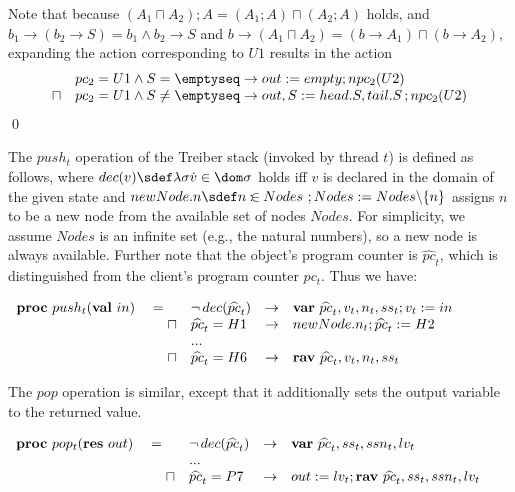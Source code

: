 \documentclass[11pt]{llncs}
\def \proc{{\bf proc}\ }
\def \hpctvar{{\widehat{pc}_t}}
\def \endbox{\hfill \qed}
\def \nasgn {\mathbin{:\joinrel\in}}
\def \asgn  {{\;:=\;}}
\def \var {{\bf var}\ }
\def \rav {{\bf rav}\ }
\def \val {{\bf val}\ }
\def \res {{\bf res}\ }
\begin{document}
\begin{example}
  \noindent 
  Note that because
  $(A_1 \sqcap A_2) ; A = (A_1 ; A) \sqcap (A_2 ; A)$ holds, and
  $b_1 \to ( b_2 \to S) = b_1 \land b_2 \to S$ and
  $b \to (A_1 \sqcap A_2) = (b \to A_1) \sqcap (b \to A_2)$,
  expanding the action corresponding to $U1$ results in the action
  \[
  \begin{array}[t]{@{}ll@{}}
    & pc_2 = U1 \land S = \emptyseq \to out \asgn empty ; npc_2(U2)\\
    \sqcap & pc_2 = U1 \land S \neq \emptyseq \to out, S \asgn head.S,
    tail.S \,; npc_2(U2)
  \end{array}
\]
  \endbox
\end{example}


\begin{example}
  \label{ex:param}
  The $push_t$ operation of the Treiber stack (invoked by thread $t$)
  is defined as follows, where
  $dec(v) \sdef \lambda \sigma \dot v \in \dom \sigma$ holds iff $v$
  is declared in the domain of the given state and
  $newNode.n \sdef n \nasgn Nodes\ ; Nodes \asgn Nodes \backslash
  \{n\}$
  assigns $n$ to be a new node from the available set of nodes
  $Nodes$. For simplicity, we assume $Nodes$ is an infinite set (e.g.,
  the natural numbers), so a new node is always available. Further
  note that the object's program counter is $\hpctvar$, which is
  distinguished from the client's program counter $pc_t$. Thus we
  have: \smallskip
  
  \noindent\hfill$\begin{array}{ll}
    \proc push_t(\val in)  & {} =
    \begin{array}[t]{@{}llll@{}}
      & \neg\, dec(\hpctvar) & \to &  \var \hpctvar, v_t, n_t, ss_t ; v_t\asgn in \\
      \sqcap & \hpctvar = H1 & \to &  newNode.n_t ; \hpctvar \asgn H2\\
& ...\\
      \sqcap & \hpctvar = H6 &\to &  \rav \hpctvar, v_t, n_t, ss_t 
    \end{array}
  \end{array}$\hfill\smallskip 

  \noindent The $pop$ operation is similar, except that it
  additionally sets the output variable to the returned
  value. \smallskip

  \noindent\hfill$
  \begin{array}[t]{ll}
    \proc pop_t (\res out)
    & {} = 
    \begin{array}[t]{@{}llll@{}}
      & \neg\, dec(\hpctvar) & \to &  \var \hpctvar, ss_t, ssn_t, lv_t \\
      & ...\\
      \sqcap & \hpctvar = P7 &\to & out \asgn 
      lv_t;  \rav \hpctvar, ss_t, ssn_t, lv_t 
    \end{array}
  \end{array}$\hfill\smallskip 


\end{example}
\end{document}
